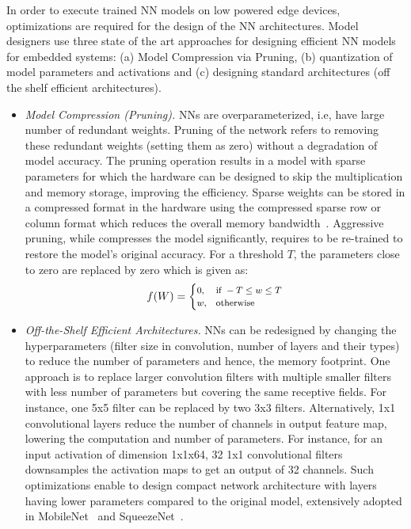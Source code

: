 In order to execute trained NN models on low powered edge devices, optimizations are required for the design of the NN architectures.
Model designers use three state of the art approaches for designing efficient NN models for embedded systems: (a) Model Compression via Pruning, (b) quantization of model parameters and activations and (c) designing standard architectures (off the shelf efficient architectures).

\begin{itemize}[leftmargin=*]
\item {\em Model Compression (Pruning).} 
NNs are overparameterized, i.e, have large number of redundant weights.
Pruning of the network refers to removing these redundant weights (setting them as zero) without a degradation of model accuracy.
The pruning operation results in a model with sparse parameters for which the hardware can be designed to skip the multiplication and memory storage, improving the efficiency.
Sparse weights can be stored in a compressed format in the hardware using the compressed sparse row or column format which reduces the overall memory bandwidth~\cite{DBLP:journals/corr/HanMD15,10.1109/ISCA.2016.30,Han:2015:LBW:2969239.2969366}.
Aggressive pruning, while compresses the model significantly, requires to be re-trained to restore the model's original accuracy.
For a threshold $T$, the parameters close to zero are replaced by zero which is given as:
\[
\footnotesize
    f(W)=
\begin{cases}
    0, & \text{if } -T \leq w \leq T\\
    w,  & \text{otherwise}
\end{cases}
\]

\item {\em Off-the-Shelf Efficient Architectures.} 
NNs can be redesigned by changing the hyperparameters (filter size in convolution, number of layers and their types) to reduce the number of parameters and hence, the memory footprint.
One approach is to replace larger convolution filters with multiple smaller filters with less number of parameters but covering the same receptive fields.
For instance, one 5x5 filter can be replaced by two 3x3 filters.
Alternatively, 1x1 convolutional layers reduce the number of channels in output feature map, lowering the computation and number of parameters.
For instance, for an input activation of dimension 1x1x64, 32 1x1 convolutional filters downsamples the activation maps to get an output of 32 channels.
Such optimizations enable to design compact network architecture with layers having lower parameters compared to the original model, extensively adopted in MobileNet~\cite{conf/cvpr/SandlerHZZC18} and SqueezeNet~\cite{DBLP:journals/corr/IandolaMAHDK16}.



\end{itemize}
